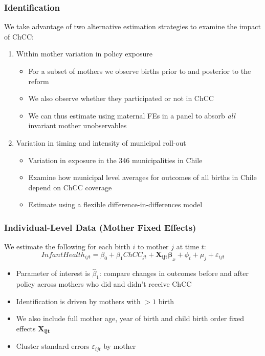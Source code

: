 \documentclass[10pt,letterpaper,subeqn,table]{beamer}
\begin{document}
\begin{frame}
\frametitle{Identification}
We take advantage of two alternative estimation strategies to examine the impact of ChCC: \\ \vspace{4mm}
\begin{enumerate}
\item<1>  Within mother variation in policy exposure
  \begin{itemize}
  \item For a subset of mothers we observe births prior to and posterior to the reform
  \item We also observe whether they participated or not in ChCC
  \item We can thus estimate using maternal FEs in a panel to absorb \emph{all} invariant mother unobservables
  \end{itemize}
\item<2> Variation in timing and intensity of municipal roll-out
  \begin{itemize}
  \item Variation in exposure in the 346 municipalities in Chile
  \item Examine how municipal level averages for outcomes of all births in Chile depend on ChCC coverage
  \item Estimate using a flexible difference-in-differences model
  \end{itemize}
\end{enumerate}
\end{frame}

\begin{frame}
\frametitle{Individual-Level Data (Mother Fixed Effects)}
We estimate the following for each birth $i$ to mother $j$ at time $t$: \vspace{3mm}
\begin{equation}
  \label{eqn:panel}
  Infant Health_{ijt} = \beta_0 + \beta_1 ChCC_{jt} + \bm{X_{ijt}\beta}_{x} + \phi_t + \mu_j + \varepsilon_{ijt}
\end{equation}
\vspace{3mm}
\begin{itemize}
\item Parameter of interest is $\widehat\beta_1$: compare changes in outcomes before and after policy across mothers who did and didn't receive ChCC
\item Identification is driven by mothers with $>1$ birth
\item We also include full mother age, year of birth and child birth order fixed effects $\bm{X_{ijt}}$
\item Cluster standard errors $\varepsilon_{ijt}$ by mother
\end{itemize}
\end{frame}
\end{document}
